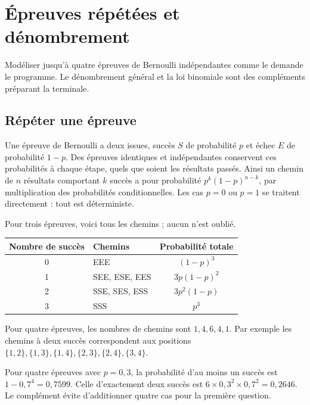 \documentclass[../cours_1re.tex]{subfiles}
\begin{document}
\setcounter{chapter}{19}
\chapter{Épreuves répétées et dénombrement}
\label{ch:20}
\begin{objectif}
Modéliser jusqu'à quatre épreuves de Bernoulli indépendantes comme le demande le programme.
Le dénombrement général et la loi binomiale sont des compléments préparant la terminale.
\end{objectif}
\section{Répéter une épreuve}
Une épreuve de Bernoulli a deux issues, succès $S$ de probabilité $p$
et échec $E$ de probabilité $1-p$. Des épreuves identiques et indépendantes
conservent ces probabilités à chaque étape, quels que soient les résultats passés.
Ainsi un chemin de $n$ résultats comportant $k$ succès a pour probabilité
$p^k(1-p)^{n-k}$, par multiplication des probabilités conditionnelles.
Les cas $p=0$ ou $p=1$ se traitent directement : tout est déterministe.

Pour trois épreuves, voici tous les chemins ; aucun n'est oublié.
\begin{center}
\begin{tabular}{clc}
\toprule Nombre de succès & Chemins & Probabilité totale\\\midrule
0 & EEE & $(1-p)^3$\\
1 & SEE, ESE, EES & $3p(1-p)^2$\\
2 & SSE, SES, ESS & $3p^2(1-p)$\\
3 & SSS & $p^3$\\\bottomrule
\end{tabular}
\end{center}
Pour quatre épreuves, les nombres de chemins sont $1,4,6,4,1$.
Par exemple les chemins à deux succès correspondent aux positions
$\{1,2\},\{1,3\},\{1,4\},\{2,3\},\{2,4\},\{3,4\}$.
\begin{exemple}
Pour quatre épreuves avec $p=0{,}3$, la probabilité d'au moins un succès
est $1-0{,}7^4=0{,}7599$. Celle d'exactement deux succès est
$6\times0{,}3^2\times0{,}7^2=0{,}2646$.
Le complément évite d'additionner quatre cas pour la première question.
\end{exemple}
\end{document}
